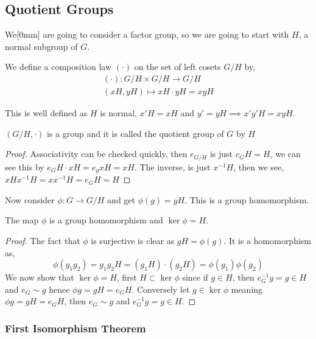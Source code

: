
\subsection{Quotient Groups}

We[0mm] are going to consider a factor group, so we are going to start with $H$, a normal subgroup of $G$.
\begin{ndefi}
  We define a composition law $(\cdot)$ on the set of left cosets $G/H$ by,
  \begin{align*}
    (\cdot) : G/H \times G/H \to G/H\\
    (xH, yH) \mapsto xH \cdot yH = xyH
  \end{align*}
\end{ndefi}
 This is well defined as $H$ is normal, $x'H = xH$ and $y' = yH \implies x'y'H = xyH$.

\begin{nprop}
   $(G/H, \cdot)$ is a group and it is called the quotient group of $G$ by $H$
 \end{nprop}
 \begin{proof}
   Associativity can be checked quickly, then $e_{G/H}$ is just $e_GH = H$, we can see this by $e_GH \cdot xH = e_gxH = xH$. The inverse, is just $x^{-1}H$, then we see, $xHx^{-1}H = xx^{-1}H = e_GH = H$
 \end{proof}

Now consider $\phi : G \to G/H$ and get $\phi(g) = gH$. This is a group homomorphism.

\begin{nprop}
  The map $\phi$ is a group homomorphism and $\ker \phi = H$.
\end{nprop}
\begin{proof}
  The fact that $\phi$ is surjective is clear as $gH = \phi(g)$. It is a homomorphism as,
  $$ \phi (g_1g_2) = g_1g_2H = (g_1H)\cdot(g_2H) = \phi(g_1)\phi(g_2) $$
  We now show that $\ker\phi = H$, first $H \subset \ker \phi$ since if $g\in H$, then $e_G^{-1}g = g \in H$ and $e_G \sim g$ hence $\phi g = gH = e_GH$. Conversely let $g \in \ker \phi$ meaning $\phi g = gH = e_GH$, then $e_G \sim g$ and $e_G^{-1}g = g \in H$.
\end{proof}

\subsubsection{First Isomorphism Theorem}

